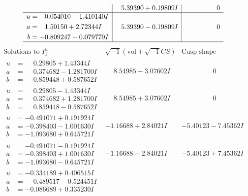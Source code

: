 \documentclass[1p]{elsarticle_modified}
\theoremstyle{definition}
\newcommand{\I}{\sqrt{-1}}
\begin{document}
$$\begin{array}{c|c|c}
 & \phantom{-}5.39390 + 0.19809 I & \phantom{-0.000000 } 0 \\ \hline\begin{aligned}
u &= -0.054010 - 1.410140 I \\
a &= \phantom{-}1.50150 + 2.72344 I \\
b &= -0.809247 - 0.079779 I\end{aligned}
 & \phantom{-}5.39390 - 0.19809 I & \phantom{-0.000000 } 0\\
 \hline 
 \end{array}$$\newpage$$\begin{array}{c|c|c}  
\text{Solutions to }I^u_{1}& \I (\text{vol} + \sqrt{-1}CS) & \text{Cusp shape}\\
 \hline 
\begin{aligned}
u &= \phantom{-}0.29805 + 1.43344 I \\
a &= \phantom{-}0.374682 - 1.281700 I \\
b &= \phantom{-}0.859448 + 0.587652 I\end{aligned}
 & \phantom{-}8.54985 - 3.07602 I & \phantom{-0.000000 } 0 \\ \hline\begin{aligned}
u &= \phantom{-}0.29805 - 1.43344 I \\
a &= \phantom{-}0.374682 + 1.281700 I \\
b &= \phantom{-}0.859448 - 0.587652 I\end{aligned}
 & \phantom{-}8.54985 + 3.07602 I & \phantom{-0.000000 } 0 \\ \hline\begin{aligned}
u &= -0.491071 + 0.191924 I \\
a &= -0.398403 - 1.001630 I \\
b &= -1.093680 + 0.645721 I\end{aligned}
 & -1.16688 + 2.84021 I & -5.40123 - 7.45362 I \\ \hline\begin{aligned}
u &= -0.491071 - 0.191924 I \\
a &= -0.398403 + 1.001630 I \\
b &= -1.093680 - 0.645721 I\end{aligned}
 & -1.16688 - 2.84021 I & -5.40123 + 7.45362 I \\ \hline\begin{aligned}
u &= -0.334189 + 0.406515 I \\
a &= \phantom{-}0.489517 - 0.524451 I \\
b &= -0.086689 + 0.335230 I\end{aligned}

\end{array}$$
\end{document}
